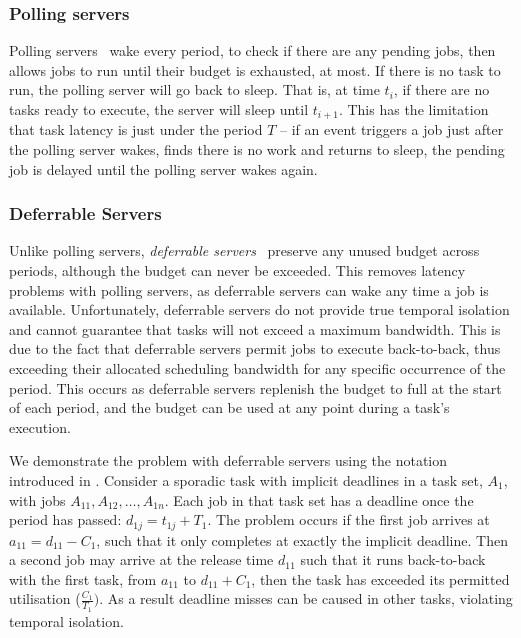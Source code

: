 \subsubsection{Polling servers}
\label{p:polling-servers}

Polling servers~\citep{Lehoczky_LS_87} wake every period,
to check if there are any pending jobs, then allows jobs to run until their budget is exhausted, at most. If there is no
task to run, the polling server will go back to sleep. That is, at time $t_{i}$, if there are no
tasks ready to execute, the server will sleep until $t_{i+1}$. This has the limitation that task latency
is just under the period $T$ -- if an event triggers a job just after the polling server wakes,
finds there is no work and returns to sleep, the pending job is delayed until the polling server
wakes again. 

\subsubsection{Deferrable Servers}
\label{p:ds} 

Unlike polling servers, \emph{deferrable
servers}~\citep{Lehoczky_LS_87, Strosnider_LS_95} preserve any unused budget across periods, although
the budget can never be exceeded.  This removes latency problems with polling servers, as deferrable
servers can wake any time a job is available. Unfortunately, deferrable servers do not provide 
true temporal isolation and cannot guarantee that tasks will not exceed a maximum bandwidth. 
This is due to the fact that deferrable servers permit jobs to execute back-to-back, thus exceeding their allocated scheduling bandwidth for any specific occurrence of
the period.  This occurs as deferrable servers replenish the budget to full at the start of each
period, and the budget can be used at any point during a task's execution. 

We demonstrate the problem with deferrable servers using the notation introduced in
. Consider a sporadic task with implicit deadlines in a task set, 
$A_{1}$, with jobs $A_{11}, A_{12}, \ldots, A_{1n}$. Each job in that task set has a deadline once the
period has passed: $d_{1j} = t_{1j} + T_{1}$. The problem occurs if the first job arrives at $a_{11}
= d_{11}-C_{1}$, such that it only completes at exactly the implicit deadline.  
Then a second job may arrive at the release time $d_{11}$ such that it runs back-to-back with the first
task, from $a_11$ to $d_{11} + C_{1}$, then the task has exceeded its permitted utilisation 
($\frac{C_{1}}{T_{1}})$. As a result deadline misses can be caused in other
tasks, violating temporal isolation.

